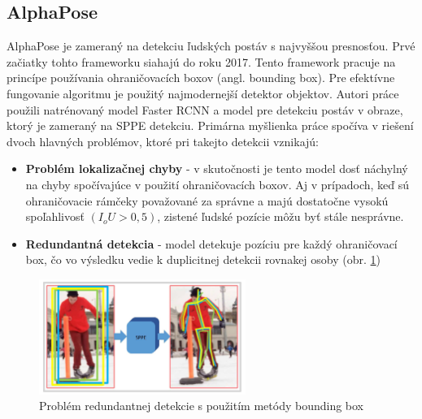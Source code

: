 \documentclass[slovak,master,dept460,male,cpp,cpdeclaration]{diploma}
\begin{document}
\subsection{AlphaPose}
AlphaPose\cite{fang2017rmpe} je zameraný na detekciu ľudských postáv s najvyššou presnosťou. Prvé začiatky tohto frameworku siahajú do roku 2017. Tento framework pracuje na princípe používania ohraničovacích boxov (angl. bounding box). Pre efektívne fungovanie algoritmu je použitý najmodernejší detektor objektov. Autori práce použili natrénovaný model Faster RCNN\cite{ren2015faster} a model pre detekciu postáv v obraze\cite{newell2016stacked}, ktorý je zameraný na SPPE detekciu. Primárna myšlienka práce spočíva v riešení dvoch hlavných problémov, ktoré pri takejto detekcii vznikajú:
\begin{itemize}
\item \textbf{Problém lokalizačnej chyby} - v skutočnosti je tento model dosť náchylný na chyby spočívajúce v použití ohraničovacích boxov. Aj v prípadoch, keď sú ohraničovacie rámčeky považované za správne a majú dostatočne vysokú spoľahlivosť \textit{$(I_oU > 0,5)$}, zistené ľudské pozície môžu byť stále nesprávne. 
\item \textbf{Redundantná detekcia} - model detekuje pozíciu pre každý ohraničovací box, čo vo výsledku vedie k duplicitnej detekcii rovnakej osoby (obr. \ref{fig:alphaPoseRedundant})
\end{itemize}

\begin{figure}[H]
	\centering
	\includegraphics[width=0.6\textwidth]{Figures/alphaPoseRedundant.png}
	\caption{Problém redundantnej detekcie s použitím metódy bounding box\cite{fang2017rmpe}}
	\label{fig:alphaPoseRedundant}
\end{figure}
\end{document}
